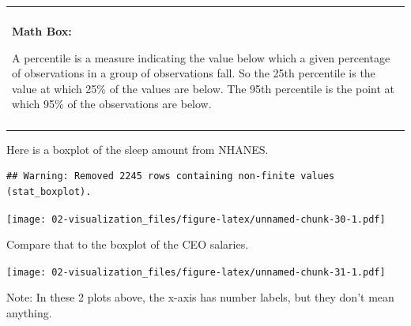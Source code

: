 \documentclass[
]{book}
\newenvironment{Shaded}{\begin{snugshade}}{\end{snugshade}}
\newcommand{\DataTypeTok}[1]{\textcolor[rgb]{0.13,0.29,0.53}{#1}}
\newcommand{\KeywordTok}[1]{\textcolor[rgb]{0.13,0.29,0.53}{\textbf{#1}}}
\newcommand{\NormalTok}[1]{#1}
\newcommand{\OperatorTok}[1]{\textcolor[rgb]{0.81,0.36,0.00}{\textbf{#1}}}
\newcommand{\StringTok}[1]{\textcolor[rgb]{0.31,0.60,0.02}{#1}}
\newenvironment{mathbox}
{
    \begin{center}
    
    \begin{tabular}{|p{0.8\textwidth}|}
    \rowcolor{LightYellow}
    \hline\\
    \rowcolor{LightYellow}
    \textbf{Math Box:}
}
{
    \\\rowcolor{LightYellow}
    \\\hline
    \end{tabular} 
    \end{center}
}
\begin{document}
\begin{mathbox}
A percentile is a measure indicating the value below which a given
percentage of observations in a group of observations fall. So the 25th
percentile is the value at which 25\% of the values are below. The 95th
percentile is the point at which 95\% of the observations are below.
\end{mathbox}

Here is a boxplot of the sleep amount from NHANES.

\begin{Shaded}
\end{Shaded}

\begin{verbatim}
## Warning: Removed 2245 rows containing non-finite values (stat_boxplot).
\end{verbatim}

\texttt{[image: 02-visualization\_files/figure-latex/unnamed-chunk-30-1.pdf]}

Compare that to the boxplot of the CEO salaries.

\begin{Shaded}
\end{Shaded}

\texttt{[image: 02-visualization\_files/figure-latex/unnamed-chunk-31-1.pdf]}

Note: In these 2 plots above, the x-axis has number labels, but they don't mean anything.
\end{document}
